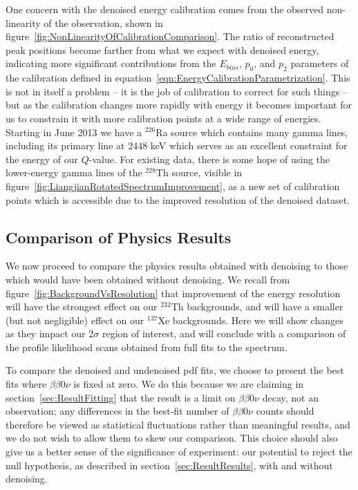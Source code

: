 One concern with the denoised energy calibration comes from the observed non-linearity of the observation, shown in figure~\ref{fig:NonLinearityOfCalibrationComparison}.  The ratio of reconstructed peak positions become farther from what we expect with denoised energy, indicating more significant contributions from the $E_{bias}$, $p_0$, and $p_2$ parameters of the calibration defined in equation~\ref{eqn:EnergyCalibrationParametrization}.  This is not in itself a problem -- it is the job of calibration to correct for such things -- but as the calibration changes more rapidly with energy it becomes important for us to constrain it with more calibration points at a wide range of energies.  Starting in June 2013 we have a $^{226}$Ra source which contains many gamma lines, including its primary line at 2448 keV which serves as an excellent constraint for the energy of our $Q$-value.  For existing data, there is some hope of using the lower-energy gamma lines of the $^{228}$Th source, visible in figure~\ref{fig:LiangjianRotatedSpectrumImprovement}, as a new set of calibration points which is accessible due to the improved resolution of the denoised dataset.

\subsection{Comparison of Physics Results}\label{sec:ResultComparisonPhysics}

We now proceed to compare the physics results obtained with denoising to those which would have been obtained without denoising.  We recall from figure~\ref{fig:BackgroundVsResolution} that improvement of the energy resolution will have the strongest effect on our $^{232}$Th backgrounds, and will have a smaller (but not negligible) effect on our $^{137}$Xe backgrounds.  Here we will show changes as they impact our $2\sigma$ region of interest, and will conclude with a comparison of the profile likelihood scans obtained from full fits to the spectrum.

To compare the denoised and undenoised pdf fits, we choose to present the best fits where $\beta\beta 0\nu$ is fixed at zero.  We do this because we are claiming in section~\ref{sec:ResultFitting} that the result is a limit on $\beta\beta 0\nu$ decay, not an observation; any differences in the best-fit number of $\beta\beta 0\nu$ counts should therefore be viewed as statistical fluctuations rather than meaningful results, and we do not wish to allow them to skew our comparison.  This choice should also give us a better sense of the significance of experiment: our potential to reject the null hypothesis, as described in section~\ref{sec:ResultResults}, with and without denoising.

